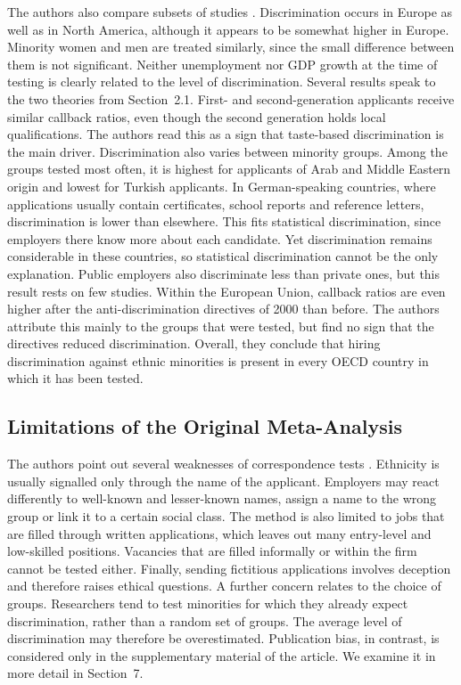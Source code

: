 \documentclass[11pt,a4paper]{article}
\begin{document}
The authors also compare subsets of studies \citep{zschirnt2016}.
Discrimination occurs in Europe as well as in North America, although it
appears to be somewhat higher in Europe. Minority women and men are treated
similarly, since the small difference between them is not significant.
Neither unemployment nor GDP growth at the time of testing is clearly
related to the level of discrimination. Several results speak to the two
theories from Section~2.1. First- and second-generation applicants receive
similar callback ratios, even though the second generation holds local
qualifications. The authors read this as a sign that taste-based
discrimination is the main driver. Discrimination also varies between
minority groups. Among the groups tested most often, it is highest for
applicants of Arab and Middle Eastern origin and lowest for Turkish
applicants. In German-speaking countries, where applications usually
contain certificates, school reports and reference letters, discrimination
is lower than elsewhere. This fits statistical discrimination, since
employers there know more about each candidate. Yet discrimination remains
considerable in these countries, so statistical discrimination cannot be
the only explanation. Public employers also discriminate less than private
ones, but this result rests on few studies. Within the European Union,
callback ratios are even higher after the anti-discrimination directives of
2000 than before. The authors attribute this mainly to the groups that were
tested, but find no sign that the directives reduced discrimination.
Overall, they conclude that hiring discrimination against ethnic minorities
is present in every OECD country in which it has been tested.
\subsection{Limitations of the Original Meta-Analysis}

The authors point out several weaknesses of correspondence tests
\citep{zschirnt2016}. Ethnicity is usually signalled only through the name
of the applicant. Employers may react differently to well-known and lesser-known names, assign a name to the wrong group or link it to a certain social class. The method is also limited to jobs that are filled through written
applications, which leaves out many entry-level and low-skilled positions.
Vacancies that are filled informally or within the firm cannot be tested
either. Finally, sending fictitious applications involves deception and
therefore raises ethical questions. A further concern relates to the choice
of groups. Researchers tend to test minorities for which they already
expect discrimination, rather than a random set of groups. The average
level of discrimination may therefore be overestimated. Publication bias,
in contrast, is considered only in the supplementary material of the
article. We examine it in more detail in Section~7.
\end{document}
